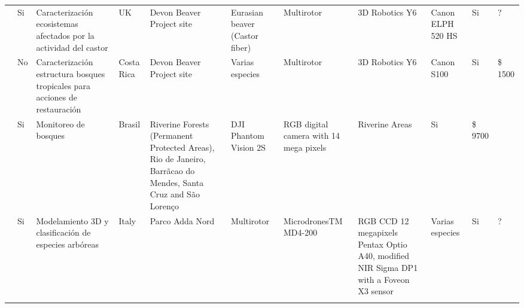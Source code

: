 \documentclass[twocolumn]{extarticle}
\begin{document}
\begin{sidewaystable}
\begin{tabular}{p{2.5cm}p{1cm}p{3cm}p{1cm}p{2cm}p{2cm}p{1cm}p{2cm}p{2cm}p{1cm}p{0.5cm}}
  \cite{Puttock2015}  & Si & Caracterización ecosistemas afectados por la actividad del castor & UK & Devon Beaver Project site & Eurasian beaver (Castor fiber) & Multirotor & 3D Robotics Y6 & Canon ELPH 520 HS  & Si & ?  \\ 
  
  \cite{Zahawi2015}  & No & Caracterización estructura bosques tropicales para acciones de restauración & Costa Rica & Devon Beaver Project site & Varias especies & Multirotor & 3D Robotics Y6 & Canon S100  & Si & \$ 1500 \\ 
  
  
  \cite{Bustamante2015}  & Si &  Monitoreo de bosques & Brasil & Riverine Forests (Permanent Protected Areas), Rio de Janeiro, Barrãcao do Mendes, Santa Cruz and São Lorenço & DJI Phantom Vision 2S  & RGB digital camera with 14 mega pixels & Riverine Areas & Si & \$ 9700  \\ 
  
  \cite{Gini2012}  & Si & Modelamiento 3D y clasificación de especies arbóreas & Italy & Parco Adda Nord
    & Multirotor  &  MicrodronesTM MD4-200 & RGB CCD 12 megapixels Pentax Optio A40, modified NIR Sigma DP1 with a Foveon X3 sensor & Varias especies & Si & ?  \\

\\ \cmidrule(r){1-11}



\end{tabular}
\end{sidewaystable}
\end{document}
